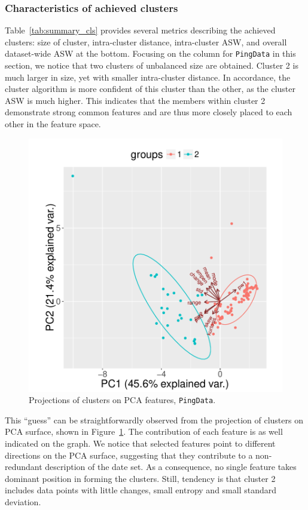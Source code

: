 \subsubsection{Characteristics of achieved clusters}
Table~\ref{tab:summary_cls} provides several metrics describing the achieved clusters: size of cluster, intra-cluster distance, intra-cluster \ac{ASW}, and overall dataset-wide \ac{ASW} at the bottom.
Focusing on the column for \texttt{PingData} in this section, we notice that two clusters of unbalanced size are obtained.
Cluster 2 is much larger in size, yet with smaller intra-cluster distance. 
In accordance, the cluster algorithm is more confident of this cluster than the other, as the cluster \ac{ASW} is much higher.
This indicates that the members within cluster 2 demonstrate strong common features and are thus more closely placed to each other in the feature space.

\begin{figure}[!htb]
\centering
\includegraphics[width=.68\textwidth]{gfx/chap3/ping_pca_ping.pdf}
\caption{Projections of clusters on \ac{PCA} features, \texttt{PingData}.}
\label{fig:ping_pca}
\end{figure}

This ``guess'' can be straightforwardly observed from the projection of clusters on \acf{PCA} surface, shown in Figure~\ref{fig:ping_pca}.
The contribution of each feature is as well indicated on the graph.
We notice that selected features point to different directions on the \ac{PCA} surface, suggesting that they contribute to a non-redundant description of the date set.
As a consequence, no single feature takes dominant position in forming the clusters.
Still, tendency is that cluster 2 includes data points with little  changes, small entropy and small standard deviation. 

